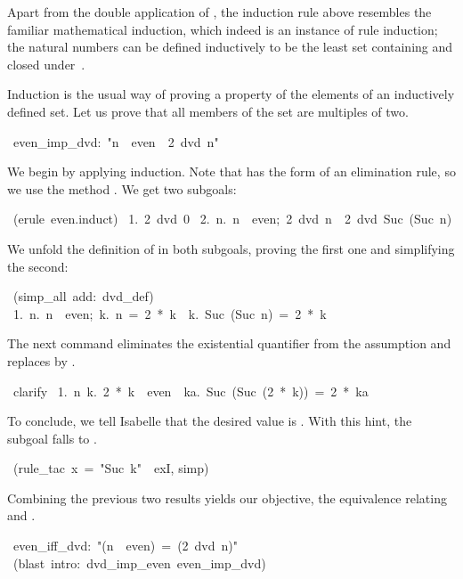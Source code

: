 Apart from the double application of , the induction rule above
resembles the familiar mathematical induction, which indeed is an instance
of rule induction; the natural numbers can be defined inductively to be
the least set containing  and closed under~.

Induction is the usual way of proving a property of the elements of an
inductively defined set.  Let us prove that all members of the set
 are multiples of two.  
\begin{isabelle}
\ even_imp_dvd:\ "n\ \isasymin \ even\ \isasymLongrightarrow \ 2\ dvd\ n"
\end{isabelle}
%
We begin by applying induction.  Note that  has the form
of an elimination rule, so we use the method .  We get two
subgoals:
\begin{isabelle}
\ (erule\ even.induct)
\isanewline\isanewline
\ 1.\ 2\ dvd\ 0\isanewline
\ 2.\ \isasymAnd n.\ \isasymlbrakk n\ \isasymin \ even;\ 2\ dvd\ n\isasymrbrakk \ \isasymLongrightarrow \ 2\ dvd\ Suc\ (Suc\ n)
\end{isabelle}
%
We unfold the definition of  in both subgoals, proving the first
one and simplifying the second:
\begin{isabelle}
\ (simp_all\ add:\ dvd_def)
\isanewline\isanewline
\ 1.\ \isasymAnd n.\ \isasymlbrakk n\ \isasymin \ even;\ \isasymexists k.\
n\ =\ 2\ *\ k\isasymrbrakk \ \isasymLongrightarrow \ \isasymexists k.\
Suc\ (Suc\ n)\ =\ 2\ *\ k
\end{isabelle}
%
The next command eliminates the existential quantifier from the assumption
and replaces  by .
\begin{isabelle}
\ clarify
\isanewline\isanewline
\ 1.\ \isasymAnd n\ k.\ 2\ *\ k\ \isasymin \ even\ \isasymLongrightarrow \ \isasymexists ka.\ Suc\ (Suc\ (2\ *\ k))\ =\ 2\ *\ ka%
\end{isabelle}
%
To conclude, we tell Isabelle that the desired value is
.  With this hint, the subgoal falls to .
\begin{isabelle}
\isacommand{apply}\ (rule_tac\ x\ =\ "Suc\ k"\ \isakeyword{in}\ exI, simp)
\end{isabelle}


\medskip
Combining the previous two results yields our objective, the
equivalence relating  and . 
%
\begin{isabelle}
\ even_iff_dvd:\ "(n\ \isasymin \ even)\ =\ (2\ dvd\ n)"\isanewline
\isacommand{by}\ (blast\ intro:\ dvd_imp_even\ even_imp_dvd)
\end{isabelle}


